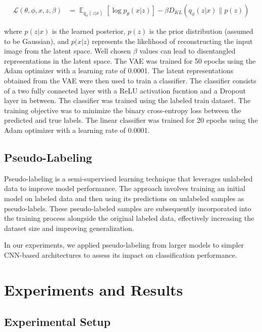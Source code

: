 \documentclass{article}
\DeclareMathOperator{\E}{\mathbb{E}}
\begin{document}
\begin{align}
  \mathcal{L}(\theta, \phi, x, z, \beta) & = \E_{q_\phi(z|x)}[\log p_\theta(x|z)] - \beta D_{KL}(q_\phi(z|x)\| p(z))
\end{align}

where $p(z|x)$ is the learned posterior, $p(z)$ is the prior distribution
(assumed to be Gaussian), and $p(x|z$) represents the likelihood of
reconstructing the input image from the latent space. Well chosen $\beta$
values can lead to disentangled representations in the latent space. The VAE
was trained for 50 epochs using the Adam optimizer with a learning rate of
0.0001. The latent representations obtained from the VAE were then used to
train a classifier. The classifier consists of a two fully connected layer with
a ReLU activation fucntion and a Dropout layer in between. The classifier was
trained using the labeled train dataset. The training objective was to minimize
the binary cross-entropy loss between the predicted and true labels. The linear
classifier was trained for 20 epochs using the Adam optimizer with a learning
rate of 0.0001.


\subsection{Pseudo-Labeling}

Pseudo-labeling is a semi-supervised learning technique that leverages
unlabeled data to improve model performance. The approach involves training an
initial model on labeled data and then using its predictions on unlabeled
samples as pseudo-labels. These pseudo-labeled samples are subsequently
incorporated into the training process alongside the original labeled data,
effectively increasing the dataset size and improving generalization.

In our experiments, we applied pseudo-labeling from larger models to simpler
CNN-based architectures to assess its impact on classification performance.

\section{Experiments and Results}

\subsection{Experimental Setup}
\end{document}

